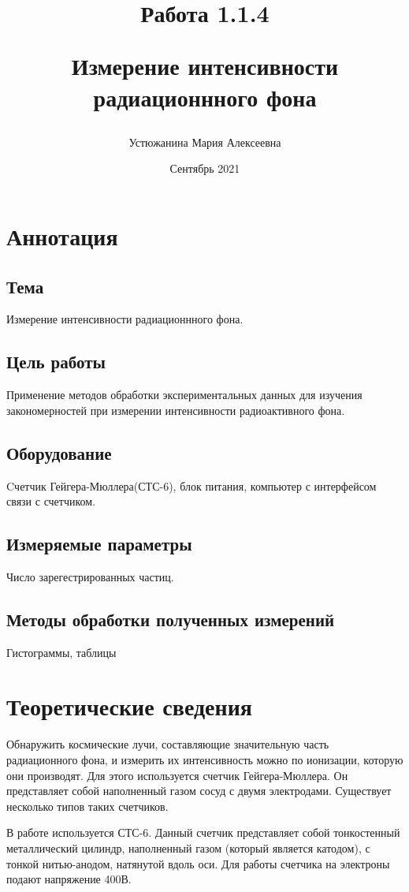 \documentclass[a4paper, 12pt]{article} %
\title{Работа 1.1.4

Измерение интенсивности радиационнного фона}
\author{Устюжанина Мария Алексеевна}
\date{Сентябрь 2021}
\begin{document}
\maketitle

\newpage

\setcounter{page}{1}

\section*{Аннотация}
\subsection*{Тема}
Измерение интенсивности радиационнного фона.

\subsection*{Цель работы}
Применение методов обработки экспериментальных данных для изучения закономерностей при измерении интенсивности радиоактивного фона.

\subsection*{Оборудование}
Cчетчик Гейгера-Мюллера(СТС-6), блок питания, компьютер с интерфейсом связи с счетчиком.

\subsection*{Измеряемые параметры}
Число зарегестрированных частиц.

\subsection*{Методы обработки полученных измерений}
Гистограммы, таблицы


\section*{Теоретические сведения}

Обнаружить космические лучи, составляющие значительную часть радиационного фона, и измерить их интенсивность можно по ионизации, которую они производят. Для этого используется счетчик Гейгера-Мюллера. Он представляет собой наполненный газом сосуд с двумя электродами. Существует несколько типов таких счетчиков.

В работе используется СТС-6. Данный счетчик представляет собой тонкостенный металлический цилиндр, наполненный газом (который является катодом), с тонкой нитью-анодом, натянутой вдоль оси. Для работы счетчика на электроны подают напряжение 400В.
\end{document}
